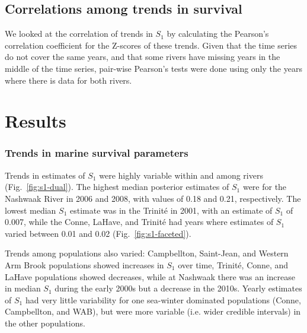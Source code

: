 \documentclass[12pt]{article}
\newcommand{\So}{$S_{1}$\xspace}
\newcommand{\comment}[1]{\par {\bfseries \color{blue} #1 \par}} %
\begin{document}
\subsection*{Correlations among trends in survival}


We looked at the correlation of trends in \So by calculating the Pearson's
correlation coefficient for the Z-scores of these trends. Given that the time
series do not cover the same years, and that some rivers have missing years in
the middle of the time series, pair-wise Pearson's tests were done using only
the years where there is data for both rivers.

\section*{Results}


\subsubsection*{Trends in marine survival parameters}

Trends in estimates of \So were highly variable within and among rivers
(Fig.~\ref{fig:s1-dual}). The highest median posterior estimates of \So
were for the Nashwaak River in 2006 and 2008, with values of 0.18 and 0.21,
respectively. The lowest median \So estimate was in the Trinit\'{e} in 2001,
with an estimate of \So of 0.007, while the Conne, LaHave, and Trinit\'{e} had
years where estimates of \So varied between 0.01 and 0.02 (Fig.~\ref{fig:s1-faceted}).

Trends among populations also varied: Campbellton,
Saint-Jean, and Western Arm Brook populations showed increases in \So
over time, Trinit\'{e}, Conne, and LaHave populations showed decreases,
while at Nashwaak there was an increase in median \So during the early
2000s but a decrease in the 2010s. Yearly estimates of \So had very little
variability for one sea-winter dominated populations (Conne, Campbellton, and
WAB), but were more variable (i.e. wider credible intervals) in the other
populations.
\end{document}
